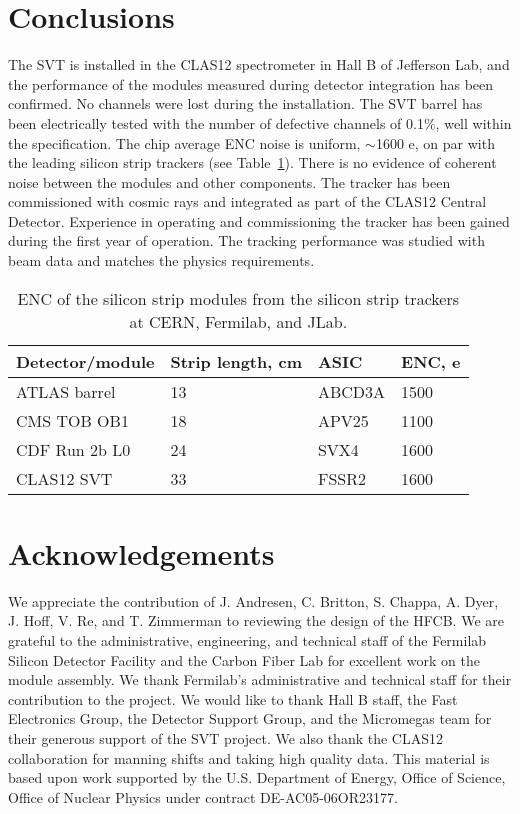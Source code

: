 \section{Conclusions}

The SVT is installed in the CLAS12 spectrometer in Hall B of Jefferson Lab, and the performance of the modules measured during detector integration has been confirmed. No channels were lost during the installation. The SVT barrel has been electrically  tested with the number of defective channels of 0.1$\%$, well within the specification. The chip average ENC noise is uniform, $\sim$1600 e, on par with the leading silicon strip trackers (see Table~\ref{tab:enc-table}). There is no evidence of coherent noise between the modules and other components. The tracker has been commissioned with cosmic rays and integrated as part of the CLAS12 Central Detector. Experience in operating and commissioning the tracker has been gained during the first year of operation. The tracking performance was studied with beam data and matches the physics requirements. 

\begin{table}[hbt]
\begin{tabular}{llll}
\hline
Detector/module      & Strip length, cm & ASIC         & ENC, e\\ \hline
ATLAS barrel           & 13                      & ABCD3A    & 1500  \\
CMS TOB OB1        & 18                      & APV25       & 1100  \\
CDF Run 2b L0        & 24                     & SVX4         & 1600  \\
CLAS12 SVT            & 33                     & FSSR2       & 1600 \\ \hline
\end{tabular}
\caption{ENC of the silicon strip modules from the silicon strip trackers at CERN, Fermilab, and JLab.}
\label{tab:enc-table}
\end{table}

\section{Acknowledgements}

We appreciate the contribution of J.  Andresen, C. Britton, S. Chappa, A. Dyer, J. Hoff, V. Re, and T. Zimmerman to reviewing the design of the HFCB. We are grateful to the administrative, engineering, and technical staff of the Fermilab Silicon Detector Facility and the Carbon Fiber Lab for excellent work on the module assembly. We thank Fermilab's administrative and technical staff for their contribution to the project. We would like to thank Hall B staff, the Fast Electronics Group, the Detector Support Group, and the Micromegas team for their generous support of the SVT project. We  also  thank the CLAS12 collaboration for manning shifts and taking high quality data. This material is based upon work supported by the U.S. Department of Energy, Office of Science, Office of Nuclear Physics under contract DE-AC05-06OR23177.


